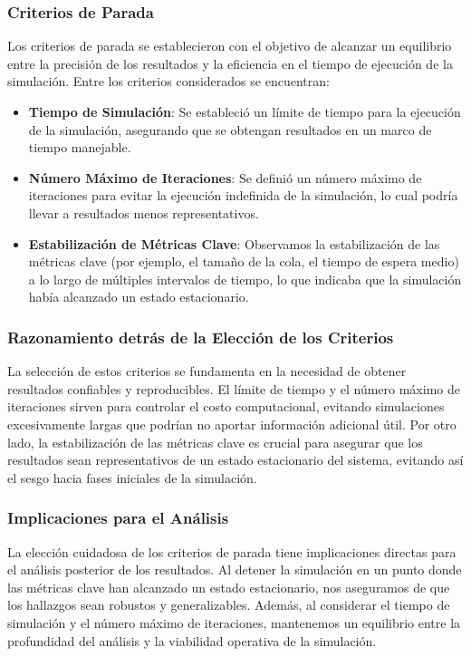 \documentclass[10pt,twocolumn]{article}
\begin{document}
\subsubsection{Criterios de Parada}
Los criterios de parada se establecieron con el objetivo de alcanzar un equilibrio entre la precisión de los resultados y la eficiencia en el tiempo de ejecución de la simulación. Entre los criterios considerados se encuentran:

\begin{itemize}
	\item \textbf{Tiempo de Simulación}: Se estableció un límite de tiempo para la ejecución de la simulación, asegurando que se obtengan resultados en un marco de tiempo manejable.
	\item \textbf{Número Máximo de Iteraciones}: Se definió un número máximo de iteraciones para evitar la ejecución indefinida de la simulación, lo cual podría llevar a resultados menos representativos.
	\item \textbf{Estabilización de Métricas Clave}: Observamos la estabilización de las métricas clave (por ejemplo, el tamaño de la cola, el tiempo de espera medio) a lo largo de múltiples intervalos de tiempo, lo que indicaba que la simulación había alcanzado un estado estacionario.
\end{itemize}

\subsubsection{Razonamiento detrás de la Elección de los Criterios}
La selección de estos criterios se fundamenta en la necesidad de obtener resultados confiables y reproducibles. El límite de tiempo y el número máximo de iteraciones sirven para controlar el costo computacional, evitando simulaciones excesivamente largas que podrían no aportar información adicional útil. Por otro lado, la estabilización de las métricas clave es crucial para asegurar que los resultados sean representativos de un estado estacionario del sistema, evitando así el sesgo hacia fases iniciales de la simulación.

\subsubsection{Implicaciones para el Análisis}
La elección cuidadosa de los criterios de parada tiene implicaciones directas para el análisis posterior de los resultados. Al detener la simulación en un punto donde las métricas clave han alcanzado un estado estacionario, nos aseguramos de que los hallazgos sean robustos y generalizables. Además, al considerar el tiempo de simulación y el número máximo de iteraciones, mantenemos un equilibrio entre la profundidad del análisis y la viabilidad operativa de la simulación.
\end{document}
